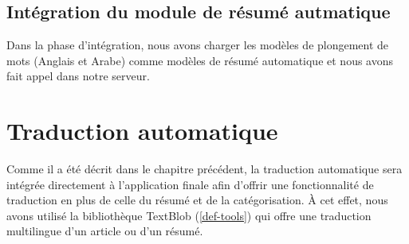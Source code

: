 \subsection{Intégration du module de résumé autmatique}
Dans la phase d'intégration, nous avons charger les modèles de plongement de mots (Anglais et Arabe) comme modèles de résumé automatique et nous avons fait appel dans notre serveur.

\section{Traduction automatique}
Comme il a été décrit dans le chapitre précédent, la traduction automatique sera intégrée directement à l'application finale afin d'offrir une fonctionnalité de traduction en plus de celle du résumé et de la catégorisation. À cet effet, nous avons utilisé la bibliothèque TextBlob (\autoref{def-tools}) qui offre une traduction multilingue d'un article ou d'un résumé.

